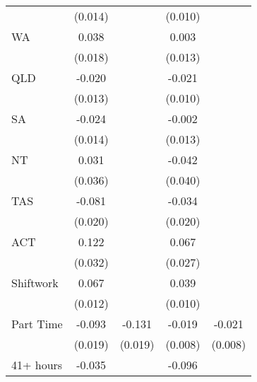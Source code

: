 {\begin{tabular}{l*{4}{c}}
                    &     (0.014)         &                     &     (0.010)         &                     \\
WA                  &       0.038\sym{**} &                     &       0.003         &                     \\
                    &     (0.018)         &                     &     (0.013)         &                     \\
QLD                 &      -0.020         &                     &      -0.021\sym{**} &                     \\
                    &     (0.013)         &                     &     (0.010)         &                     \\
SA                  &      -0.024\sym{*}  &                     &      -0.002         &                     \\
                    &     (0.014)         &                     &     (0.013)         &                     \\
NT                  &       0.031         &                     &      -0.042         &                     \\
                    &     (0.036)         &                     &     (0.040)         &                     \\
TAS                 &      -0.081\sym{***}&                     &      -0.034\sym{*}  &                     \\
                    &     (0.020)         &                     &     (0.020)         &                     \\
ACT                 &       0.122\sym{***}&                     &       0.067\sym{**} &                     \\
                    &     (0.032)         &                     &     (0.027)         &                     \\
Shiftwork           &       0.067\sym{***}&                     &       0.039\sym{***}&                     \\
                    &     (0.012)         &                     &     (0.010)         &                     \\
Part Time           &      -0.093\sym{***}&      -0.131\sym{***}&      -0.019\sym{**} &      -0.021\sym{***}\\
                    &     (0.019)         &     (0.019)         &     (0.008)         &     (0.008)         \\
41+ hours           &      -0.035\sym{***}&                     &      -0.096\sym{***}&                     \\

\end{tabular}}
